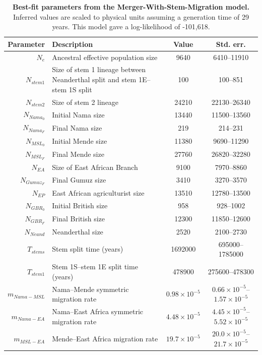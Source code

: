 \documentclass[]{article}
\begin{document}
\begin{table}[ht]
\caption{
    \label{tab:supp-merger-with-stem-migration}
    \textbf{Best-fit parameters from the Merger-With-Stem-Migration model.}
    Inferred values are scaled to physical units assuming a generation time of
    29 years. This model gave a log-likelihood of -101,618.
}
\centering
\begin{tabular}[t]{rP{8cm}cc}
    \toprule
    Parameter & Description & Value & Std. err.\\
    \midrule
    $N_e$ & Ancestral effective population size & 9640 & 6410--11910 \\
    $N_{stem1}$ & Size of stem 1 lineage between Neanderthal split and stem 1E--stem 1S split & 100 & 100--851 \\
    $N_{stem2}$ & Size of stem 2 lineage & 24210 & 22130--26340 \\
    $N_{Nama_0}$ & Initial Nama size & 13440 & 11500--13560 \\
    $N_{Nama_F}$ & Final Nama size & 219 & 214--231 \\
    $N_{MSL_0}$ & Initial Mende size & 11380 & 9690--11290 \\
    $N_{MSL_F}$ & Final Mende size & 27760 & 26820--32280 \\
    $N_{EA}$ & Size of East African Branch & 9100 & 7970--8860 \\
    $N_{Gumuz_F}$ & Final Gumuz size & 3410 & 3270--3570 \\
    $N_{EP}$ & East African agriculturist size & 13510 & 12780--13500 \\
    $N_{GBR_0}$ & Initial British size & 958 & 928--1002 \\
    $N_{GBR_F}$ & Final British size & 12300 & 11850--12600 \\
    $N_{Neand}$ & Neanderthal size & 2520 & 2100--2730 \\
    $T_{stems}$ & Stem split time (years) & 1692000 & 695000--1785000 \\
    $T_{stem1}$ & Stem 1S--stem 1E split time (years) & 478900 & 275600--478300 \\
    $m_{Nama-MSL}$ & Nama--Mende symmetric migration rate & $0.98\times10^{-5}$ & $0.66\times10^{-5}$--$1.57\times10^{-5}$ \\
    $m_{Nama-EA}$ & Nama--East Africa symmetric migration rate & $4.48\times10^{-5}$ & $4.45\times10^{-5}$--$5.52\times10^{-5}$ \\
    $m_{MSL-EA}$ & Mende--East Africa migration rate & $19.7\times10^{-5}$ & $20.0\times10^{-5}$--$21.7\times10^{-5}$ \\

\end{tabular}
\end{table}
\end{document}
